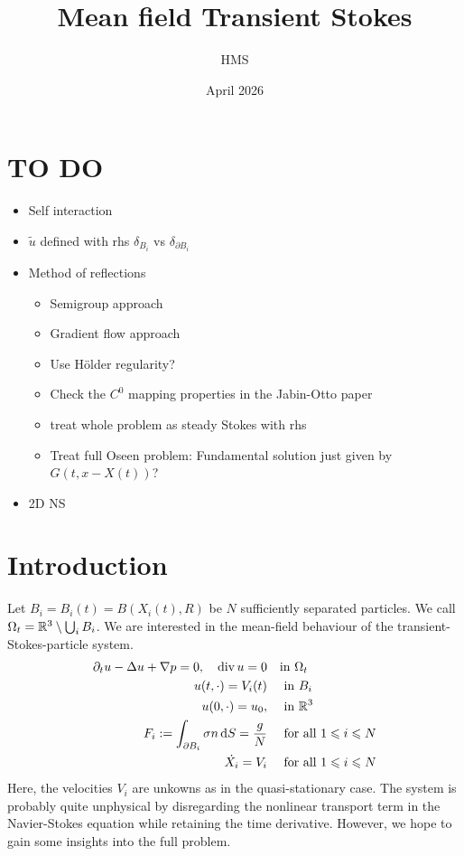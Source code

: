 \documentclass[abstracton, paper=a4, fontsize=11pt,DIV=12,bibliography=totoc]{scrartcl}
\title{Mean field Transient Stokes}
\author{HMS}
\date{April 2026}
\begin{document}
\maketitle

\section{TO DO}

\begin{itemize}
    \item Self interaction
    \item $\tilde u$ defined with rhs $\delta_{B_i}$ vs $\delta_{\partial B_i}$
    \item Method of reflections
    \begin{itemize}
        \item Semigroup approach
        \item Gradient flow approach
        \item Use H\"older regularity? 
        \item Check the $C^0$  mapping properties in the Jabin-Otto paper
        \item treat whole problem as steady Stokes with rhs
        \item Treat full Oseen problem: Fundamental solution just given by $G(t,x-X(t))$?
    \end{itemize}
    \item 2D NS
\end{itemize}

\section{Introduction}

Let $B_i=B_i(t) = B(X_i(t),R)$ be $N$ sufficiently separated particles. We call $\Omega_t=\mathbb{R}^3\setminus \bigcup_i B_i$. We are interested in the mean-field behaviour of the transient-Stokes-particle system.
\begin{align*}
    \partial_t u-\Delta u+\nabla p=0,\quad  \operatorname{div} u=0 &\quad \text{in } \Omega_t\\
    u(t,\cdot)=V_i(t)&\quad \text{ in } B_i\\
    u(0, \cdot)=u_0, &\quad \text{ in } \mathbb{R}^3 \\
    F_i :=\int_{\partial B_i} \sigma n \, \mathrm{d} S=\frac gN & \quad \text{ for all } 1 \leqslant i \leqslant N \\
    \dot{X_i}=V_i& \quad \text{ for all } 1 \leqslant i \leqslant N 
\end{align*}
Here, the velocities $V_i$ are unkowns as in the quasi-stationary case. 
The system is probably quite unphysical by disregarding the nonlinear transport term in the Navier-Stokes equation while retaining the time derivative. However, we hope to gain some insights into the full problem. 
\end{document}
